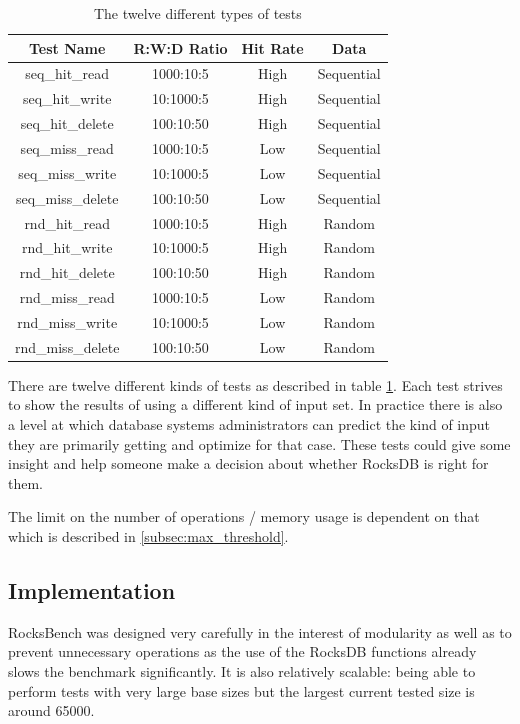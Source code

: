 \documentclass[twocolumn,11pt]{article}
\begin{document}
\begin{table}[h!]
  \begin{tabular}{ |c|c|c|c| }
    \hline
    Test Name & R:W:D Ratio & Hit Rate & Data \\
    \hline \hline
    seq\_hit\_read & 1000:10:5 & High & Sequential \\ \hline
    seq\_hit\_write & 10:1000:5 & High & Sequential \\ \hline
    seq\_hit\_delete & 100:10:50 & High & Sequential \\ \hline
    seq\_miss\_read & 1000:10:5 & Low & Sequential \\ \hline
    seq\_miss\_write & 10:1000:5 & Low & Sequential \\ \hline
    seq\_miss\_delete & 100:10:50 & Low & Sequential \\ \hline
    rnd\_hit\_read & 1000:10:5 & High & Random \\ \hline
    rnd\_hit\_write & 10:1000:5 & High & Random \\ \hline
    rnd\_hit\_delete & 100:10:50 & High & Random \\ \hline
    rnd\_miss\_read & 1000:10:5 & Low & Random \\ \hline
    rnd\_miss\_write & 10:1000:5 & Low & Random \\ \hline
    rnd\_miss\_delete & 100:10:50 & Low & Random \\ \hline
  \end{tabular}
  \caption{The twelve different types of tests}
  \label{tab:types_of_tests}
\end{table}

There are twelve different kinds of tests as described in table
\ref{tab:types_of_tests}. Each test strives to show the results of using a
different kind of input set. In practice there is also a level at which database
systems administrators can predict the kind of input they are primarily getting
and optimize for that case. These tests could give some insight and help someone
make a decision about whether RocksDB is right for them.

The limit on the number of operations / memory usage is dependent on that which
is described in \ref{subsec:max_threshold}.

\subsection{Implementation}

RocksBench was designed very carefully in the interest of modularity as well as
to prevent unnecessary operations as the use of the RocksDB functions already
slows the benchmark significantly. It is also relatively scalable: being able to
perform tests with very large base sizes but the largest current tested size is
around 65000.
\end{document}
